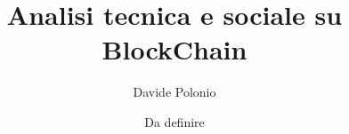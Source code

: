 \documentclass{beamer}
\title{Analisi tecnica e sociale su BlockChain}
\author{Davide Polonio}
\date{Da definire}
\institute{Università degli studi di Padova}
\begin{document}
\graphicspath{{res/image/}}


\end{document}
